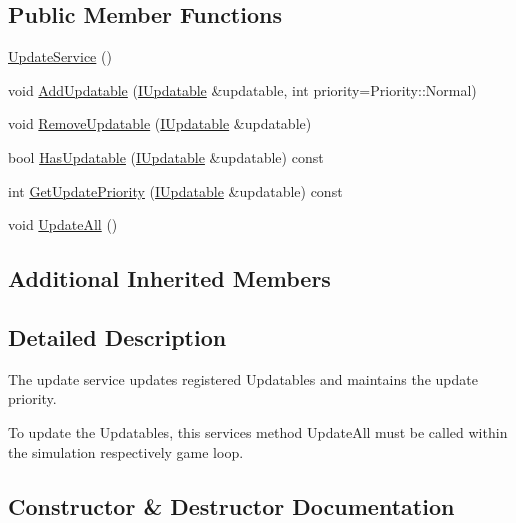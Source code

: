 \subsection*{Public Member Functions}
\begin{DoxyCompactItemize}
\item 
\hyperlink{classastu_1_1UpdateService_ae4d88fb4772931e35f7c46b7d756b4c8}{Update\+Service} ()
\item 
void \hyperlink{classastu_1_1UpdateService_aeccc68d2764d15d0bc78c25b83bb2510}{Add\+Updatable} (\hyperlink{classastu_1_1IUpdatable}{I\+Updatable} \&updatable, int priority=Priority\+::\+Normal)
\item 
void \hyperlink{classastu_1_1UpdateService_aa861a19c8b3fe72b45b8f886f3d945db}{Remove\+Updatable} (\hyperlink{classastu_1_1IUpdatable}{I\+Updatable} \&updatable)
\item 
bool \hyperlink{classastu_1_1UpdateService_ab76b0993cefac357bc37e690c75bfdee}{Has\+Updatable} (\hyperlink{classastu_1_1IUpdatable}{I\+Updatable} \&updatable) const
\item 
int \hyperlink{classastu_1_1UpdateService_a7e8d2c8cd7238349f3a10a8d2c3ebe32}{Get\+Update\+Priority} (\hyperlink{classastu_1_1IUpdatable}{I\+Updatable} \&updatable) const
\item 
void \hyperlink{classastu_1_1UpdateService_a9ee615ce365e1910446a2646b0a2ad9a}{Update\+All} ()
\end{DoxyCompactItemize}
\subsection*{Additional Inherited Members}


\subsection{Detailed Description}
The update service updates registered {\ttfamily Updatables} and maintains the update priority.

To update the {\ttfamily Updatables}, this service\textquotesingle{}s method {\ttfamily Update\+All} must be called within the simulation respectively game loop. 

\subsection{Constructor \& Destructor Documentation}
\mbox{\label{classastu_1_1UpdateService_ae4d88fb4772931e35f7c46b7d756b4c8}} 
